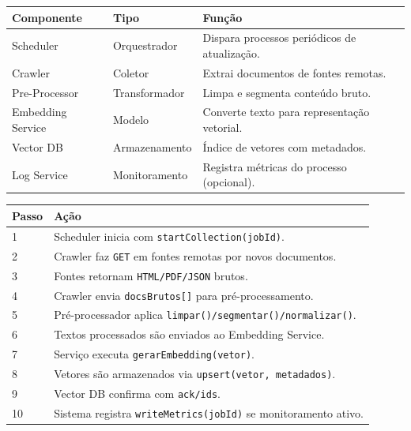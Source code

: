 \begin{description}
\begin{table}[h]
\centering
\begin{tabular}{|p{3cm}|p{4cm}|p{8cm}|}
    \hline
    \textbf{Componente} & \textbf{Tipo} & \textbf{Função} \\ \hline
    Scheduler & Orquestrador & Dispara processos periódicos de atualização. \\ \hline
    Crawler & Coletor & Extrai documentos de fontes remotas. \\ \hline
    Pre-Processor & Transformador & Limpa e segmenta conteúdo bruto. \\ \hline
    Embedding Service & Modelo & Converte texto para representação vetorial. \\ \hline
    Vector DB & Armazenamento & Índice de vetores com metadados. \\ \hline
    Log Service & Monitoramento & Registra métricas do processo (opcional). \\ \hline
\end{tabular}
\end{table}

\begin{table}[h]
\centering
\begin{tabular}{|p{2cm}|p{13cm}|}
    \hline
    \textbf{Passo} & \textbf{Ação} \\ \hline
    1 & Scheduler inicia com \texttt{startCollection(jobId)}. \\ \hline
    2 & Crawler faz \texttt{GET} em fontes remotas por novos documentos. \\ \hline
    3 & Fontes retornam \texttt{HTML/PDF/JSON} brutos. \\ \hline
    4 & Crawler envia \texttt{docsBrutos[]} para pré-processamento. \\ \hline
    5 & Pré-processador aplica \texttt{limpar()/segmentar()/normalizar()}. \\ \hline
    6 & Textos processados são enviados ao Embedding Service. \\ \hline
    7 & Serviço executa \texttt{gerarEmbedding(vetor)}. \\ \hline
    8 & Vetores são armazenados via \texttt{upsert(vetor, metadados)}. \\ \hline
    9 & Vector DB confirma com \texttt{ack/ids}. \\ \hline
    10 & Sistema registra \texttt{writeMetrics(jobId)} se monitoramento ativo. \\ \hline
\end{tabular}
\end{table}
    

\end{description}
